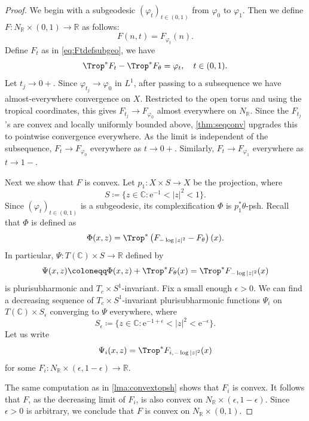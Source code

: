 \begin{proof}
We begin with a subgeodesic $(\varphi_t)_{t\in (0,1)}$ from $\varphi_0$ to $\varphi_1$. Then we define $F\colon N_{\mathbb{R}}\times (0,1)\rightarrow \mathbb{R}$ as follows:
    \[
    F(n,t)=F_{\varphi_t}(n).
    \]
    Define $F_t$ as in \eqref{eq:Ftdefsubgeo}, we have
    \[
    \Trop^* F_t-\Trop^* F_{\theta}=\varphi_t,\quad t\in (0,1).
    \]
    Let $t_j\to 0+$. Since $\varphi_{t_j}\to\varphi_0$ in $L^1$, after passing to a subsequence we have almost-everywhere convergence on $X$. Restricted to the open torus and using the tropical coordinates, this gives $F_{t_j}\to F_{\varphi_0}$ almost everywhere on $N_{\mathbb R}$. Since the $F_{t_j}$'s are convex and locally uniformly bounded above, \cref{thm:seqconv} upgrades this to pointwise convergence everywhere. As the limit is independent of the subsequence, $F_t\to F_{\varphi_0}$ everywhere as $t\to0+$. Similarly, $F_t\to F_{\varphi_1}$ everywhere as $t\to 1-$.

    Next we show that $F$ is convex. Let $p_1\colon X\times S\rightarrow X$ be the projection, where
    \[
    S\coloneqq \{z\in \mathbb{C}:  \mathrm{e}^{-1}<|z|^2<1\}.
    \]
    Since $(\varphi_t)_{t\in(0,1)}$ is a subgeodesic, its complexification $\Phi$ is $p_1^*\theta$-psh. Recall that $\Phi$ is defined as
    \begin{equation}\label{eq:Phixz}
    \Phi(x,z)=\Trop^*\left( F_{-\log |z|^2}-F_{\theta} \right)(x).
    \end{equation}
    In particular, $\Psi\colon T(\mathbb{C})\times S\rightarrow \mathbb{R}$ defined by
    \[
    \Psi(x,z)\coloneqq \Phi(x,z)+\Trop^*F_{\theta}(x)=\Trop^*F_{-\log |z|^2}(x)
    \]
    is plurisubharmonic and $T_c\times S^1$-invariant.
    Fix a small enough $\epsilon>0$. We can find a decreasing sequence of $T_c\times S^1$-invariant plurisubharmonic functions $\Psi_i$ on $T(\mathbb{C})\times S_{\epsilon}$ converging to $\Psi$ everywhere, where
    \[
    S_{\epsilon}\coloneqq \{z\in \mathbb{C}: \mathrm{e}^{-1+\epsilon}<|z|^2<\mathrm{e}^{-\epsilon}\}.
    \]
    Let us write
    \[
    \Psi_i(x,z)=\Trop^*F_{i,-\log |z|^2}(x)
    \]
    for some $F_i\colon N_{\mathbb{R}}\times (\epsilon,1-\epsilon)\rightarrow \mathbb{R}$.

    The same computation as in \cref{lma:convextopsh} shows that $F_i$ is convex. It follows that $F$, as the decreasing limit of $F_i$, is also convex on $N_{\mathbb{R}}\times (\epsilon,1-\epsilon)$. Since $\epsilon>0$ is arbitrary, we conclude that $F$ is convex on $N_{\mathbb{R}}\times (0,1)$.


\end{proof}
